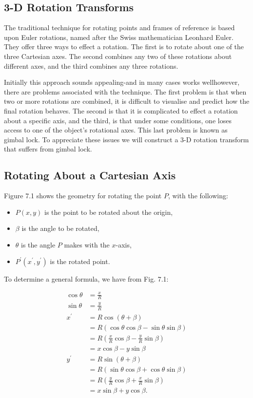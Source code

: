 \documentclass[10pt]{article}
\begin{document}
\subsection{3-D Rotation Transforms}
The traditional technique for rotating points and frames of reference is based upon Euler rotations, named after the Swiss mathematician Leonhard Euler. They offer three ways to effect a rotation. The first is to rotate about one of the three Cartesian axes. The second combines any two of these rotations about different axes, and the third combines any three rotations.

Initially this approach sounds appealing-and in many cases works wellhowever, there are problems associated with the technique. The first problem is that when two or more rotations are combined, it is difficult to visualise and predict how the final rotation behaves. The second is that it is complicated to effect a rotation about a specific axis, and the third, is that under some conditions, one loses access to one of the object's rotational axes. This last problem is known as gimbal lock. To appreciate these issues we will construct a 3-D rotation transform that suffers from gimbal lock.

\subsection{Rotating About a Cartesian Axis}
Figure 7.1 shows the geometry for rotating the point $P$, with the following:

\begin{itemize}
  \item $P(x, y)$ is the point to be rotated about the origin,

  \item $\beta$ is the angle to be rotated,

  \item $\theta$ is the angle $P$ makes with the $x$-axis,

  \item $P^{\prime}\left(x^{\prime}, y^{\prime}\right)$ is the rotated point.

\end{itemize}

To determine a general formula, we have from Fig. 7.1:

$$
\begin{aligned}
\cos \theta & =\frac{x}{R} \\
\sin \theta & =\frac{y}{R} \\
x^{\prime} & =R \cos (\theta+\beta) \\
& =R(\cos \theta \cos \beta-\sin \theta \sin \beta) \\
& =R\left(\frac{x}{R} \cos \beta-\frac{y}{R} \sin \beta\right) \\
& =x \cos \beta-y \sin \beta \\
y^{\prime} & =R \sin (\theta+\beta) \\
& =R(\sin \theta \cos \beta+\cos \theta \sin \beta) \\
& =R\left(\frac{y}{R} \cos \beta+\frac{x}{R} \sin \beta\right) \\
& =x \sin \beta+y \cos \beta .
\end{aligned}
$$
\end{document}
